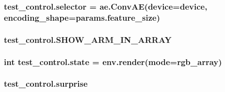 \subsubsection[{\texorpdfstring{selector}{selector}}]{\setlength{\rightskip}{0pt plus 5cm}test\+\_\+control.\+selector = ae.\+Conv\+AE({\bf device}={\bf device}, encoding\+\_\+shape=params.\+feature\+\_\+size)}\hypertarget{namespacetest__control_ad93174840888f121d55f7d07f6ac1d4a}{}\label{namespacetest__control_ad93174840888f121d55f7d07f6ac1d4a}
\subsubsection[{\texorpdfstring{S\+H\+O\+W\+\_\+\+A\+R\+M\+\_\+\+I\+N\+\_\+\+A\+R\+R\+AY}{SHOW_ARM_IN_ARRAY}}]{\setlength{\rightskip}{0pt plus 5cm}test\+\_\+control.\+S\+H\+O\+W\+\_\+\+A\+R\+M\+\_\+\+I\+N\+\_\+\+A\+R\+R\+AY}\hypertarget{namespacetest__control_a53dd4677c9659d292016e7e010417a2f}{}\label{namespacetest__control_a53dd4677c9659d292016e7e010417a2f}
\subsubsection[{\texorpdfstring{state}{state}}]{\setlength{\rightskip}{0pt plus 5cm}int test\+\_\+control.\+state = env.\+render(mode=\textquotesingle{}rgb\+\_\+array\textquotesingle{})}\hypertarget{namespacetest__control_a7b0da9f1ea8ad357ed139e89a50d7ca2}{}\label{namespacetest__control_a7b0da9f1ea8ad357ed139e89a50d7ca2}
\subsubsection[{\texorpdfstring{surprise}{surprise}}]{\setlength{\rightskip}{0pt plus 5cm}test\+\_\+control.\+surprise}\hypertarget{namespacetest__control_af52c7060bf842b062819b98ccc6a3ad1}{}\label{namespacetest__control_af52c7060bf842b062819b98ccc6a3ad1}
